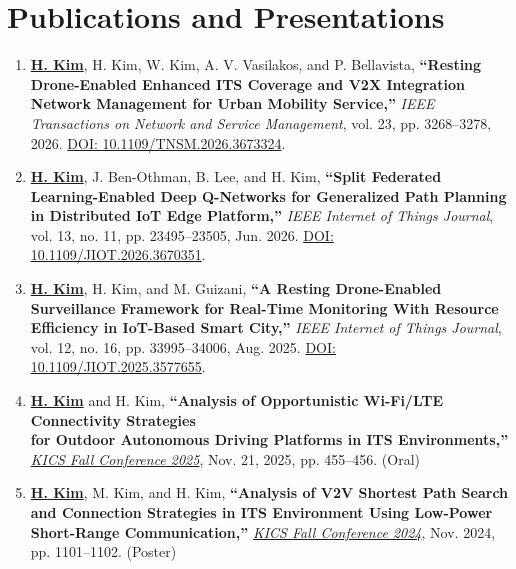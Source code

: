 \documentclass[a4paper,11pt]{article}
\begin{document}
\section{\textbf{Publications and Presentations}}
\small{
  \begin{enumerate}[itemsep=0.8em]

    \item \textbf{\underline{H. Kim}}, H. Kim, W. Kim, A. V. Vasilakos, and P. Bellavista,
    \textbf{``Resting Drone-Enabled Enhanced ITS Coverage and V2X Integration Network Management for Urban Mobility Service,''}
    \textit{IEEE Transactions on Network and Service Management}, vol. 23, pp. 3268--3278, 2026. \href{https://doi.org/10.1109/TNSM.2026.3673324}{DOI: 10.1109/TNSM.2026.3673324}.

    \item \textbf{\underline{H. Kim}}, J. Ben-Othman, B. Lee, and H. Kim,
    \textbf{``Split Federated Learning-Enabled Deep Q-Networks for Generalized Path Planning in Distributed IoT Edge Platform,''}
    \textit{IEEE Internet of Things Journal}, vol. 13, no. 11, pp. 23495--23505, Jun. 2026. \href{https://doi.org/10.1109/JIOT.2026.3670351}{DOI: 10.1109/JIOT.2026.3670351}.

    \item \textbf{\underline{H. Kim}}, H. Kim, and M. Guizani,
    \textbf{``A Resting Drone-Enabled Surveillance Framework for Real-Time Monitoring With Resource Efficiency in IoT-Based Smart City,''}
    \textit{IEEE Internet of Things Journal}, vol. 12, no. 16, pp. 33995--34006, Aug. 2025. \href{https://doi.org/10.1109/JIOT.2025.3577655}{DOI: 10.1109/JIOT.2025.3577655}.

    \item \textbf{\underline{H. Kim}} and H. Kim,
    \textbf{``Analysis of Opportunistic Wi-Fi/LTE Connectivity Strategies \\
    for Outdoor Autonomous Driving Platforms in ITS Environments,''}
    \href{https://www.dbpia.co.kr/journal/articleDetail?nodeId=NODE12566863}{\textit{KICS Fall Conference 2025}}, Nov. 21, 2025, pp. 455--456. (Oral)

    \item \textbf{\underline{H. Kim}}, M. Kim, and H. Kim,
    \textbf{``Analysis of V2V Shortest Path Search and Connection Strategies in ITS Environment Using Low-Power Short-Range Communication,''}
    \href{https://www.dbpia.co.kr/journal/articleDetail?nodeId=NODE12035067}{\textit{KICS Fall Conference 2024}}, Nov. 2024, pp. 1101--1102. (Poster)

  \end{enumerate}
}
\end{document}
